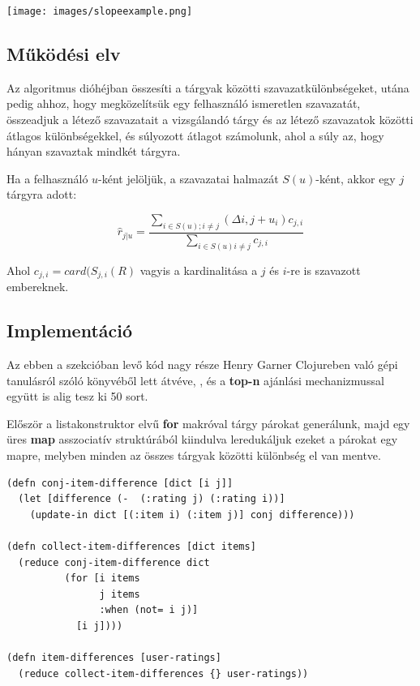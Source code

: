 \documentclass[final, 12pt] {ubb_dolgozat}{book}
\begin{document}
\begin{center}
\texttt{[image: images/slopeexample.png]}
\end{center}


\subsection{Működési elv}
\label{sec:orga8ae0c4}
Az algoritmus dióhéjban összesíti a tárgyak közötti szavazatkülönbségeket,
utána pedig ahhoz, hogy megközelítsük egy felhasználó ismeretlen szavazatát, összeadjuk a
létező szavazatait a vizsgálandó tárgy és az létező szavazatok közötti átlagos különbségekkel,
és súlyozott átlagot számolunk, ahol a súly az, hogy hányan szavaztak mindkét tárgyra.

Ha a felhasználó \(u\)-ként jelöljük, a szavazatai halmazát \(S(u)\)-ként, akkor egy \(j\) tárgyra
adott:

\begin{equation}
\hat{r}_{j|u} = \frac{\sum_{i \in S(u); i \not= j}{(\Delta{i,j} + u_{i})c_{j,i}}}{\sum_{i \in S(u) i \not= j} c_{j,i}}
\end{equation}

\citep{lemireSlopeOnePredictors2008}

Ahol \(c_{j,i} = card(S_{j,i}(R)\) vagyis a kardinalitása a \(j\) és \(i\)-re is szavazott embereknek.

\subsection{Implementáció}
\label{sec:orgb38a3f8}
Az ebben a szekcióban levő kód nagy része Henry Garner Clojureben való gépi tanulásról
szóló könyvéből lett átvéve, \citep{garnerClojureDataScience2015} , és a \textbf{top-n} ajánlási mechanizmussal együtt is alig tesz ki 50 sort.

Először a listakonstruktor elvű \textbf{for} makróval tárgy párokat generálunk, majd egy üres \textbf{map} asszociatív struktúrából kiindulva leredukáljuk ezeket a párokat egy mapre, melyben
minden az összes tárgyak közötti különbség el van mentve.

\begin{verbatim}
(defn conj-item-difference [dict [i j]]
  (let [difference (-  (:rating j) (:rating i))]
    (update-in dict [(:item i) (:item j)] conj difference)))

(defn collect-item-differences [dict items]
  (reduce conj-item-difference dict
          (for [i items
                j items
                :when (not= i j)]
            [i j])))

(defn item-differences [user-ratings]
  (reduce collect-item-differences {} user-ratings))
\end{verbatim}
\end{document}
